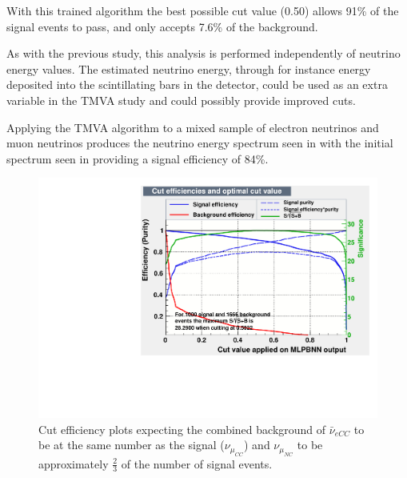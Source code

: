With this trained algorithm the best possible cut value (0.50) allows 91\% of the signal events to pass, and only accepts 7.6\% of the background.

As with the previous study, this analysis is performed independently of neutrino energy values. The estimated neutrino energy, through for instance energy deposited into the scintillating bars in the detector, could be used as an extra variable in the TMVA study and could possibly provide improved cuts. %

Applying the TMVA algorithm to a mixed sample of electron neutrinos and muon neutrinos produces the neutrino energy spectrum seen in  with the initial spectrum seen in  providing a signal efficiency of 84\%.


\begin{figure}[h!]
\centering

\includegraphics[width=\textwidth]{figures/newTMVAplots/CorrCutMLPBNN.pdf}
\caption{Cut efficiency plots expecting the combined background of $\bar{\nu}_{eCC}$ to be at the same number as the signal ($\nu_{\mu_{CC}}$) and $\nu_{\mu_{NC}}$ to be approximately $\frac{2}{3}$ of the number of signal events. }
\label{fig:TMVANeucuts}
\end{figure}


